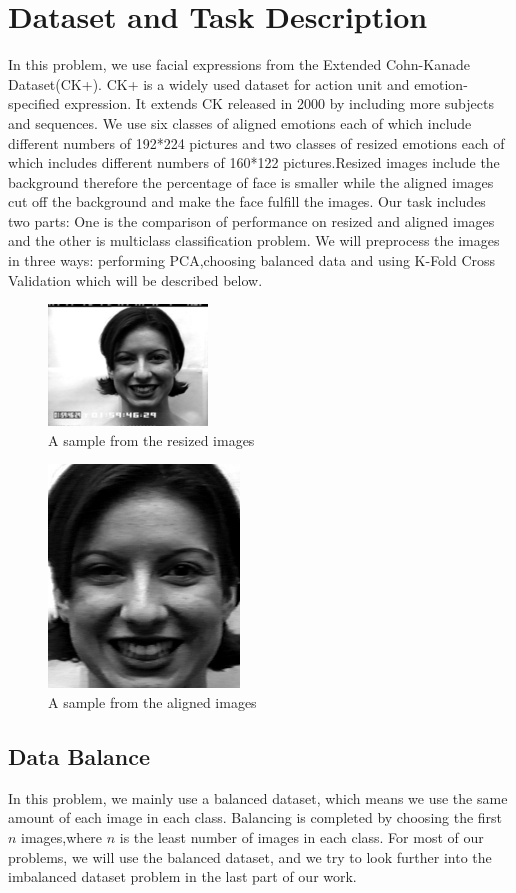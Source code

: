 \documentclass{article} %
\begin{document}
\section{Dataset and Task Description}
In this problem, we use facial expressions from the Extended Cohn-Kanade Dataset(CK+). CK+ is a widely used dataset for action unit
and emotion-specified expression. It extends CK released in 2000 by including more subjects and sequences. We use six classes of aligned emotions each of which include different numbers of 192*224 pictures and two classes of resized emotions each of which includes different numbers of 160*122 pictures.Resized images include the background therefore the percentage of face is smaller while the aligned images cut off the background and make the face fulfill the images. 
Our task includes two parts: One is the comparison of performance on resized and aligned images and the other is multiclass classification problem. We will preprocess the images in three ways: performing PCA,choosing balanced data and using K-Fold Cross Validation which will be described below.
\begin{figure}	
	\centering
	\includegraphics[scale=1]{./graph/resized_sample.png}
	\caption{A sample from the resized images}
\end{figure}
\begin{figure}	
	\centering
	\includegraphics[scale=0.6]{./graph/aligned_sample.png}
	\caption{A sample from the aligned images}
\end{figure}
\subsection {Data Balance}
In this problem, we mainly use a balanced dataset, which means we use the same amount of each image in each class. Balancing is completed by choosing the first $n$ images,where $n$ is the least number of images in each class. For most of our problems, we will use the balanced dataset, and we try to look further into the imbalanced dataset problem in the last part of our work.
\end{document}
